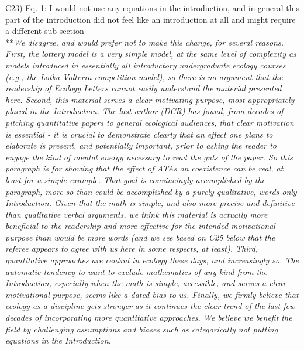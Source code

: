 \documentclass[letterpaper,11pt]{article}
\begin{document}
\noindent C23) Eq. 1: I would not use any equations in the introduction, and in general this part of the introduction did not feel like an introduction at all and might require a different sub-section \\

\noindent ***\emph{We disagree, and would prefer not to make this change, for several reasons. 
First, the lottery model is a very simple model, at the same level of complexity
as models introduced in essentially all introductory 
undergraduate ecology courses (e.g., the Lotka-Volterra competition model), so there is no argument that 
the readership of Ecology Letters cannot easily understand the material presented here.
Second, this material serves a clear motivating purpose, most appropriately placed in the Introduction. 
The last author (DCR) has found, from decades of pitching 
quantitative papers to general ecological audiences, that clear motivation is essential - it is crucial to demonstrate 
clearly that an effect one plans to elaborate is present, and potentially important, prior to asking the reader to engage 
the kind of mental energy necessary to read the guts of the paper. So this 
paragraph is for showing that the effect of ATAs on coexistence can be real, at least for a simple 
example. That goal is convincingly 
accomplished by the paragraph, more so than could be accomplished by a purely qualitative, words-only Introduction. 
Given that the math is simple, and also more precise and definitive than 
qualitative verbal arguments, we think this material is actually
more beneficial to the readership and more effective for the intended motivational purpose than would be more words
(and we see based on C25 below that the referee appears to agree with us here in some respects, at least). 
Third, quantitative approaches are central in ecology these days, and increasingly so. The automatic tendency
to want to exclude mathematics of any kind from the Introduction, especially when the math is simple,
accessible, and serves a clear motivational purpose, seems like a dated bias to us. 
Finally, we firmly believe that ecology as a discipline gets stronger as it continues the clear
trend of the last few decades of incorporating more quantitative approaches. We believe we
benefit the field by challenging assumptions and biases such as categorically not putting equations 
in the Introduction.} \\
\end{document}
